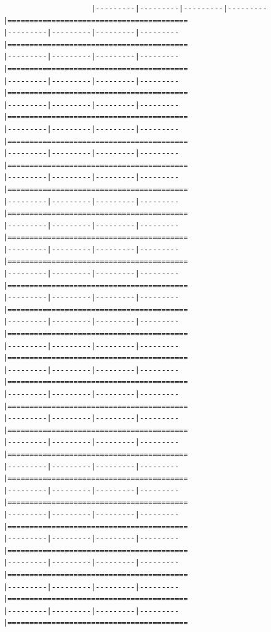 \documentclass[
]{article}
\begin{document}
\begin{verbatim}
                    |---------|---------|---------|---------|=========================================                                          |---------|---------|---------|---------|=========================================                                          |---------|---------|---------|---------|=========================================                                          |---------|---------|---------|---------|=========================================                                          |---------|---------|---------|---------|=========================================                                          |---------|---------|---------|---------|=========================================                                          |---------|---------|---------|---------|=========================================                                          |---------|---------|---------|---------|=========================================                                          |---------|---------|---------|---------|=========================================                                          |---------|---------|---------|---------|=========================================                                          |---------|---------|---------|---------|=========================================                                          |---------|---------|---------|---------|=========================================                                          |---------|---------|---------|---------|=========================================                                          |---------|---------|---------|---------|=========================================                                          |---------|---------|---------|---------|=========================================                                          |---------|---------|---------|---------|=========================================                                          |---------|---------|---------|---------|=========================================                                          |---------|---------|---------|---------|=========================================                                          |---------|---------|---------|---------|=========================================                                          |---------|---------|---------|---------|=========================================                                          |---------|---------|---------|---------|=========================================                                          |---------|---------|---------|---------|=========================================                                          |---------|---------|---------|---------|=========================================                                          |---------|---------|---------|---------|=========================================                                          |---------|---------|---------|---------|=========================================                                          |---------|---------|---------|---------|=========================================                                          
\end{verbatim}
\end{document}
